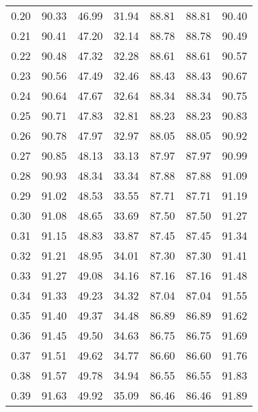 \begin{tabular}{|c|c|c|c|c|c|c|}
      0.20 &     90.33 &     46.99 &      31.94 &   88.81 &      88.81 &         90.40 \\
      0.21 &     90.41 &     47.20 &      32.14 &   88.78 &      88.78 &         90.49 \\
      0.22 &     90.48 &     47.32 &      32.28 &   88.61 &      88.61 &         90.57 \\
      0.23 &     90.56 &     47.49 &      32.46 &   88.43 &      88.43 &         90.67 \\
      0.24 &     90.64 &     47.67 &      32.64 &   88.34 &      88.34 &         90.75 \\
      0.25 &     90.71 &     47.83 &      32.81 &   88.23 &      88.23 &         90.83 \\
      0.26 &     90.78 &     47.97 &      32.97 &   88.05 &      88.05 &         90.92 \\
      0.27 &     90.85 &     48.13 &      33.13 &   87.97 &      87.97 &         90.99 \\
      0.28 &     90.93 &     48.34 &      33.34 &   87.88 &      87.88 &         91.09 \\
      0.29 &     91.02 &     48.53 &      33.55 &   87.71 &      87.71 &         91.19 \\
      0.30 &     91.08 &     48.65 &      33.69 &   87.50 &      87.50 &         91.27 \\
      0.31 &     91.15 &     48.83 &      33.87 &   87.45 &      87.45 &         91.34 \\
      0.32 &     91.21 &     48.95 &      34.01 &   87.30 &      87.30 &         91.41 \\
      0.33 &     91.27 &     49.08 &      34.16 &   87.16 &      87.16 &         91.48 \\
      0.34 &     91.33 &     49.23 &      34.32 &   87.04 &      87.04 &         91.55 \\
      0.35 &     91.40 &     49.37 &      34.48 &   86.89 &      86.89 &         91.62 \\
      0.36 &     91.45 &     49.50 &      34.63 &   86.75 &      86.75 &         91.69 \\
      0.37 &     91.51 &     49.62 &      34.77 &   86.60 &      86.60 &         91.76 \\
      0.38 &     91.57 &     49.78 &      34.94 &   86.55 &      86.55 &         91.83 \\
      0.39 &     91.63 &     49.92 &      35.09 &   86.46 &      86.46 &         91.89 \\

\end{tabular}
